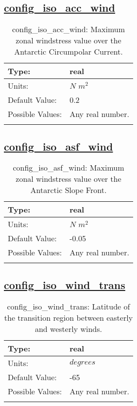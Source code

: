 \subsection[config\_iso\_acc\_wind]{\hyperref[sec:nm_tab_iso]{config\_iso\_acc\_wind}}
\label{subsec:nm_sec_config_iso_acc_wind}
\begin{center}
\begin{longtable}{| p{2.0in} || p{4.0in} |}
    \hline
    Type: & real \\
    \hline
    Units: & $N$ $m^{2}$ \\
    \hline
    Default Value: & 0.2 \\
    \hline
    Possible Values: & Any real number. \\
    \hline
    \caption{config\_iso\_acc\_wind: Maximum zonal windstress value over the Antarctic Circumpolar Current.}
\end{longtable}
\end{center}
\subsection[config\_iso\_asf\_wind]{\hyperref[sec:nm_tab_iso]{config\_iso\_asf\_wind}}
\label{subsec:nm_sec_config_iso_asf_wind}
\begin{center}
\begin{longtable}{| p{2.0in} || p{4.0in} |}
    \hline
    Type: & real \\
    \hline
    Units: & $N$ $m^{2}$ \\
    \hline
    Default Value: & -0.05 \\
    \hline
    Possible Values: & Any real number. \\
    \hline
    \caption{config\_iso\_asf\_wind: Maximum zonal windstress value over the Antarctic Slope Front.}
\end{longtable}
\end{center}
\subsection[config\_iso\_wind\_trans]{\hyperref[sec:nm_tab_iso]{config\_iso\_wind\_trans}}
\label{subsec:nm_sec_config_iso_wind_trans}
\begin{center}
\begin{longtable}{| p{2.0in} || p{4.0in} |}
    \hline
    Type: & real \\
    \hline
    Units: & $degrees$ \\
    \hline
    Default Value: & -65 \\
    \hline
    Possible Values: & Any real number. \\
    \hline
    \caption{config\_iso\_wind\_trans: Latitude of the transition region between easterly and westerly winds.}
\end{longtable}
\end{center}
